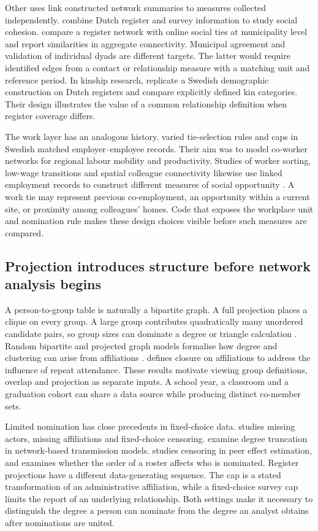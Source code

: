 Other uses link constructed network summaries to measures collected independently. \citet{pitoski2025} combine Dutch register and survey information to study social cohesion. \citet{menyhert2025} compare a register network with online social ties at municipality level and report similarities in aggregate connectivity. Municipal agreement and validation of individual dyads are different targets. The latter would require identified edges from a contact or relationship measure with a matching unit and reference period. In kinship research, \citet{debel2025} replicate a Swedish demographic construction on Dutch registers and compare explicitly defined kin categories. Their design illustrates the value of a common relationship definition when register coverage differs.

The work layer has an analogous history. \citet{lengyel2017} varied tie-selection rules and caps in Swedish matched employer--employee records. Their aim was to model co-worker networks for regional labour mobility and productivity. Studies of worker sorting, low-wage transitions and spatial colleague connectivity likewise use linked employment records to construct different measures of social opportunity \citep{eliason2023,baranowska2023,song2026}. A work tie may represent previous co-employment, an opportunity within a current site, or proximity among colleagues' homes. Code that exposes the workplace unit and nomination rule makes these design choices visible before such measures are compared.

\subsection{Projection introduces structure before network analysis begins}

A person-to-group table is naturally a bipartite graph. A full projection places a clique on every group. A large group contributes quadratically many unordered candidate pairs, so group sizes can dominate a degree or triangle calculation \citep{latapy2008}. Random bipartite and projected graph models formalise how degree and clustering can arise from affiliations \citep{newman2001}. \citet{brunson2015} defines closure on affiliations to address the influence of repeat attendance. These results motivate viewing group definitions, overlap and projection as separate inputs. A school year, a classroom and a graduation cohort can share a data source while producing distinct co-member sets.

Limited nomination has close precedents in fixed-choice data. \citet{kossinets2006} studies missing actors, missing affiliations and fixed-choice censoring. \citet{harling2018} examine degree truncation in network-based transmission models. \citet{griffith2022} studies censoring in peer effect estimation, and \citet{neal2024} examines whether the order of a roster affects who is nominated. Register projections have a different data-generating sequence. The cap is a stated transformation of an administrative affiliation, while a fixed-choice survey cap limits the report of an underlying relationship. Both settings make it necessary to distinguish the degree a person can nominate from the degree an analyst obtains after nominations are united.

